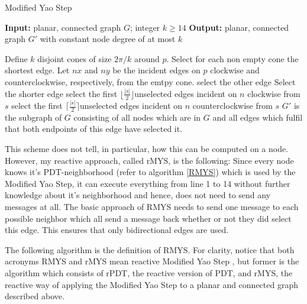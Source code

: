 \algrenewcommand\algorithmicprocedure{\textbf{}}
\begin{algorithm}\small
\caption{Modified Yao Step}\label{MYS}
\begin{algorithmic}[1]
\Statex \textbf{Input:} planar, connected graph $G $; integer $k\geq 14 $
\Statex \textbf{Output:} planar, connected graph $G' $ with constant node degree of at most $k $

\Statex

	\State Define $k $ disjoint cones of size $2\pi/k $ around $p $.
	\State Select for each non empty cone the shortest edge.
			\State Let $nx $ and $ny $ be the incident edges on $p $ clockwise and \State counterclockwise, respectively, from the emtpy cone.
				\State select the other edge
				\Else
				\State Select the shorter edge
			\EndIf 
		\Else
			\State select the first $\lfloor \frac{|s|}{2} \rfloor $unselected edges incident on $n $ clockwise from $s $
			\State select the first $\lceil \frac{|s|}{2} \rceil $unselected edges incident on $n $ counterclockwise from $s $
		\EndIf
	\EndFor
\EndFor
\Statex $ G' $ is the subgraph of $G $ consisting of all nodes which are in $G $ and all edges which fulfil that both endpoints of this edge have selected it. 
\end{algorithmic}
\end{algorithm}
 
This scheme does not tell, in particular, how this can be computed on a node.
However, my reactive approach, called rMYS, is the following: Since every node knows it's PDT-neighborhood (refer to algorithm \ref{RMYS}) which is used by the Modified Yao Step, it can execute everything from line 1 to 14 without further knowledge about it's neighborhood and hence, does not need to send any messages at all.
The basic approach of RMYS needs to send one message to each possible neighbor which all send a message back whether or not they did select this edge.
This ensures that only bidirectional edges are used.

The following algorithm is the definition of RMYS.
For clarity, notice that both acronyms RMYS and rMYS mean \grqq reactive Modified Yao Step \grqq, but former is the algorithm which consists of rPDT, the reactive version of PDT, and rMYS, the reactive way of applying the Modified Yao Step to a planar and connected graph described above.
 
